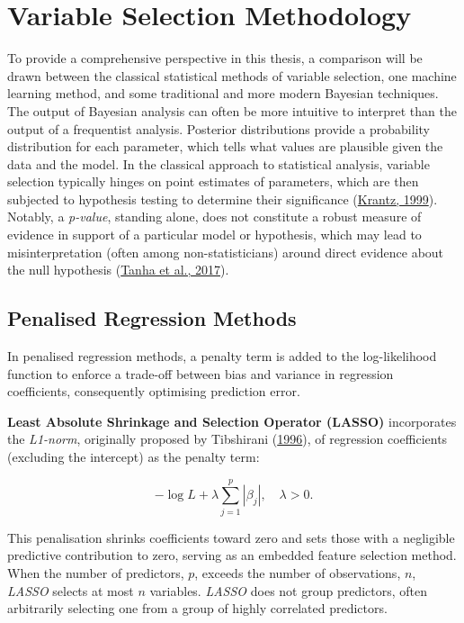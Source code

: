 \documentclass[
  11pt,
]{article}
\begin{document}
\section{Variable Selection Methodology}

To provide a comprehensive perspective in this thesis, a comparison will
be drawn between the classical statistical methods of variable
selection, one machine learning method, and some traditional and more
modern Bayesian techniques. The output of Bayesian analysis can often be
more intuitive to interpret than the output of a frequentist analysis.
Posterior distributions provide a probability distribution for each
parameter, which tells what values are plausible given the data and the
model. In the classical approach to statistical analysis, variable
selection typically hinges on point estimates of parameters, which are
then subjected to hypothesis testing to determine their significance
(\protect\hyperlink{ref-Krantz1999}{Krantz, 1999}). Notably, a
\emph{p-value}, standing alone, does not constitute a robust measure of
evidence in support of a particular model or hypothesis, which may lead
to misinterpretation (often among non-statisticians) around direct
evidence about the null hypothesis
(\protect\hyperlink{ref-Tanha2017}{Tanha et al., 2017}).

\subsection{Penalised Regression Methods}

In penalised regression methods, a penalty term is added to the
log-likelihood function to enforce a trade-off between bias and variance
in regression coefficients, consequently optimising prediction error.

\textbf{Least Absolute Shrinkage and Selection Operator (LASSO)}
incorporates the \emph{L1-norm}, originally proposed by Tibshirani
(\protect\hyperlink{ref-Tibshirani1996}{1996}), of regression
coefficients (excluding the intercept) as the penalty term:

\begin{equation}
- \log L + \lambda \sum_{j=1}^{p} |\beta_j|, \quad \lambda > 0.
\end{equation}

This penalisation shrinks coefficients toward zero and sets those with a
negligible predictive contribution to zero, serving as an embedded
feature selection method. When the number of predictors, \(p\), exceeds
the number of observations, \(n\), \emph{LASSO} selects at most \(n\)
variables. \emph{LASSO} does not group predictors, often arbitrarily
selecting one from a group of highly correlated predictors.
\end{document}

